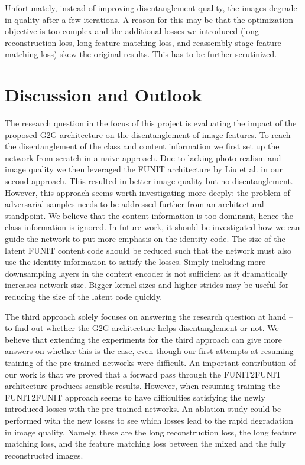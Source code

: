 \documentclass[conference]{IEEEtran}
\begin{document}
Unfortunately, instead of improving disentanglement quality, the images degrade in quality after a few iterations. A reason for this may be that the optimization objective is too complex and the additional losses we introduced (long reconstruction loss, long feature matching loss, and reassembly stage feature matching loss) skew the original results. This has to be further scrutinized.

\label{chap6_discussion}
\section{Discussion and Outlook}
The research question in the focus of this project is evaluating the impact of the proposed G2G architecture on the disentanglement of image features. To reach the disentanglement of the class and content information we first set up the network from scratch in a naive approach. Due to lacking photo-realism and image quality we then leveraged the FUNIT architecture by Liu et al. in our second approach. This resulted in better image quality but no disentanglement. However, this approach seems worth investigating more deeply: the problem of adversarial samples needs to be addressed further from an architectural standpoint. We believe that the content information is too dominant, hence the class information is ignored. In future work, it should be investigated how we can guide the network to put more emphasis on the identity code. The size of the latent FUNIT content code should be reduced such that the network must also use the identity information to satisfy the losses. Simply including more downsampling layers in the content encoder is not sufficient as it dramatically increases network size. Bigger kernel sizes and higher strides may be useful for reducing the size of the latent code quickly.

The third approach solely focuses on answering the research question at hand -- to find out whether the G2G architecture helps disentanglement or not. We believe that extending the experiments for the third approach can give more answers on whether this is the case, even though our first attempts at resuming training of the pre-trained networks were difficult. An important contribution of our work is that we proved that a forward pass through the FUNIT2FUNIT architecture produces sensible results. However, when resuming training the FUNIT2FUNIT approach seems to have difficulties satisfying the newly introduced losses with the pre-trained networks. An ablation study could be performed with the new losses to see which losses lead to the rapid degradation in image quality. Namely, these are the long reconstruction loss, the long feature matching loss, and the feature matching loss between the mixed and the fully reconstructed images. 
\end{document}
